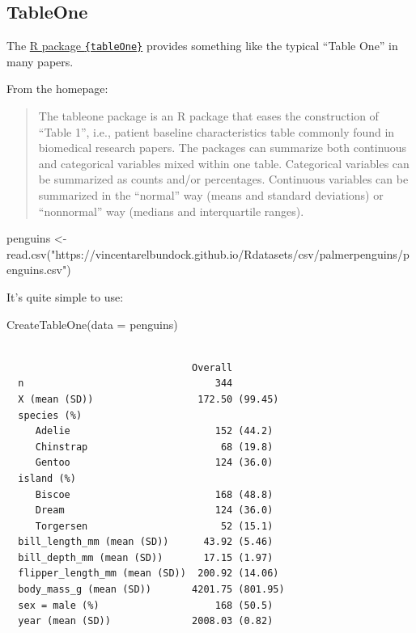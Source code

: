 \documentclass[
  letterpaper,
  DIV=11,
  numbers=noendperiod]{scrreprt}
\newenvironment{Shaded}{\begin{snugshade}}{\end{snugshade}}
\newcommand{\AttributeTok}[1]{\textcolor[rgb]{0.40,0.45,0.13}{#1}}
\newcommand{\FunctionTok}[1]{\textcolor[rgb]{0.28,0.35,0.67}{#1}}
\newcommand{\NormalTok}[1]{\textcolor[rgb]{0.00,0.23,0.31}{#1}}
\newcommand{\OtherTok}[1]{\textcolor[rgb]{0.00,0.23,0.31}{#1}}
\newcommand{\StringTok}[1]{\textcolor[rgb]{0.13,0.47,0.30}{#1}}
\theoremstyle{definition}
\theoremstyle{definition}
\theoremstyle{remark}
\begin{document}
\hypertarget{tableone}{%
\subsection{TableOne}\label{tableone}}

The
\href{https://cran.r-project.org/web/packages/tableone/vignettes/introduction.html}{R
package \texttt{\{tableOne\}}} provides something like the typical
``Table One'' in many papers.

From the homepage:

\begin{quote}
The tableone package is an R package that eases the construction of
``Table 1'', i.e., patient baseline characteristics table commonly found
in biomedical research papers. The packages can summarize both
continuous and categorical variables mixed within one table. Categorical
variables can be summarized as counts and/or percentages. Continuous
variables can be summarized in the ``normal'' way (means and standard
deviations) or ``nonnormal'' way (medians and interquartile ranges).
\end{quote}

\begin{Shaded}
\begin{Highlighting}[]
\NormalTok{penguins }\OtherTok{\textless{}{-}} \FunctionTok{read.csv}\NormalTok{(}\StringTok{"https://vincentarelbundock.github.io/Rdatasets/csv/palmerpenguins/penguins.csv"}\NormalTok{)}
\end{Highlighting}
\end{Shaded}

It's quite simple to use:

\begin{Shaded}
\begin{Highlighting}[]
\FunctionTok{CreateTableOne}\NormalTok{(}\AttributeTok{data =}\NormalTok{ penguins)}
\end{Highlighting}
\end{Shaded}

\begin{verbatim}
                               
                                Overall         
  n                                 344         
  X (mean (SD))                  172.50 (99.45) 
  species (%)                                   
     Adelie                         152 (44.2)  
     Chinstrap                       68 (19.8)  
     Gentoo                         124 (36.0)  
  island (%)                                    
     Biscoe                         168 (48.8)  
     Dream                          124 (36.0)  
     Torgersen                       52 (15.1)  
  bill_length_mm (mean (SD))      43.92 (5.46)  
  bill_depth_mm (mean (SD))       17.15 (1.97)  
  flipper_length_mm (mean (SD))  200.92 (14.06) 
  body_mass_g (mean (SD))       4201.75 (801.95)
  sex = male (%)                    168 (50.5)  
  year (mean (SD))              2008.03 (0.82)  
\end{verbatim}
\end{document}
